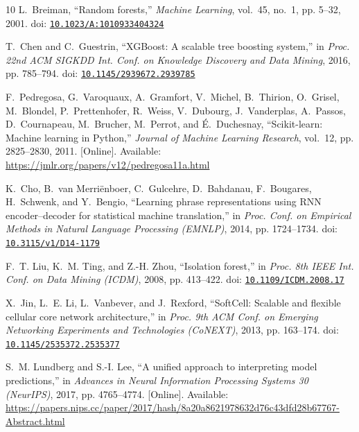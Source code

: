 \begin{thebibliography}{10}
L.~Breiman, ``Random forests,'' \emph{Machine Learning}, vol.~45, no.~1, pp.
  5--32, 2001. doi:
  \href{https://doi.org/10.1023/A:1010933404324}{\nolinkurl{10.1023/A:1010933404324}}

T.~Chen and C.~Guestrin, ``{XGBoost}: A scalable tree boosting system,'' in
  \emph{Proc. 22nd ACM SIGKDD Int. Conf. on Knowledge Discovery and Data
  Mining}, 2016, pp. 785--794. doi:
  \href{https://doi.org/10.1145/2939672.2939785}{\nolinkurl{10.1145/2939672.2939785}}

\BIBentryALTinterwordspacing
F.~Pedregosa, G.~Varoquaux, A.~Gramfort, V.~Michel, B.~Thirion, O.~Grisel,
  M.~Blondel, P.~Prettenhofer, R.~Weiss, V.~Dubourg, J.~Vanderplas, A.~Passos,
  D.~Cournapeau, M.~Brucher, M.~Perrot, and {\'E}.~Duchesnay, ``Scikit-learn:
  Machine learning in {Python},'' \emph{Journal of Machine Learning Research},
  vol.~12, pp. 2825--2830, 2011. [Online]. Available:
  \url{https://jmlr.org/papers/v12/pedregosa11a.html}
\BIBentrySTDinterwordspacing

K.~Cho, B.~van Merri{\"e}nboer, C.~Gulcehre, D.~Bahdanau, F.~Bougares,
  H.~Schwenk, and Y.~Bengio, ``Learning phrase representations using {RNN}
  encoder--decoder for statistical machine translation,'' in \emph{Proc. Conf.
  on Empirical Methods in Natural Language Processing (EMNLP)}, 2014, pp.
  1724--1734. doi:
  \href{https://doi.org/10.3115/v1/D14-1179}{\nolinkurl{10.3115/v1/D14-1179}}

F.~T. Liu, K.~M. Ting, and Z.-H. Zhou, ``Isolation forest,'' in \emph{Proc. 8th
  IEEE Int. Conf. on Data Mining (ICDM)}, 2008, pp. 413--422. doi:
  \href{https://doi.org/10.1109/ICDM.2008.17}{\nolinkurl{10.1109/ICDM.2008.17}}

X.~Jin, L.~E. Li, L.~Vanbever, and J.~Rexford, ``{SoftCell}: Scalable and
  flexible cellular core network architecture,'' in \emph{Proc. 9th ACM Conf.
  on Emerging Networking Experiments and Technologies (CoNEXT)}, 2013, pp.
  163--174. doi:
  \href{https://doi.org/10.1145/2535372.2535377}{\nolinkurl{10.1145/2535372.2535377}}

\BIBentryALTinterwordspacing
S.~M. Lundberg and S.-I. Lee, ``A unified approach to interpreting model
  predictions,'' in \emph{Advances in Neural Information Processing Systems 30
  (NeurIPS)}, 2017, pp. 4765--4774. [Online]. Available:
  \url{https://papers.nips.cc/paper/2017/hash/8a20a8621978632d76c43dfd28b67767-Abstract.html}
\BIBentrySTDinterwordspacing


\end{thebibliography}
